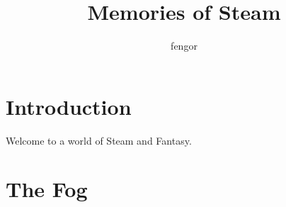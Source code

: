 \documentclass[a4paper,smart,nonsubmission]{sffms}
\title{Memories of Steam}
\author{fengor}
\begin{document}
\chapter{Introduction}
Welcome to a world of Steam and Fantasy. 


\chapter{The Fog}


\end{document}
